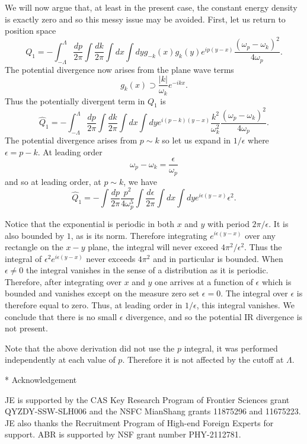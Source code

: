 \def\letter{0}\def\pr{0}\documentclass[a4paper,12pt, epsfig]{article}
\makeatletter
\renewcommand{\(}{\begin{equation}}
\renewcommand{\)}{end{equation} \vspace{-.05in}\linebreak}
\renewcommand{\=}{\hspace{-.03in}=\hspace{-.02in}}
\renewcommand{\(}{\begin{equation}}
\renewcommand{\)}{\end{equation}}
\renewcommand{\(}{\begin{equation}}
\renewcommand{\)}{\end{equation}}
\def\lpin#1{\int^\Lambda_{-\Lambda} \frac{d#1}{2\pi}}
\def\pin#1{\int \frac{d#1}{2\pi}}
\newcommand{\beq}{\begin{equation}}
\newcommand{\eeq}{\end{equation}}
\def\section{\@startsection{section}{1}{\z@}{3.5ex plus 1ex minus  .2ex}{2.3ex plus .2ex}{\large\bf}}
\makeatother
\begin{document}
We will now argue that, at least in the present case, the constant energy density is exactly zero and so this messy issue may be avoided.  First, let us return to position space
\beq
Q_1=-\lpin{p}\pin{k}\int dx\int dy {g}_{-k}(x)  {g}_k(y) e^{ip(y-x)} \frac{\left(\omega_{p}-\omega_k\right)^2}{4\omega_p}.
\eeq
The potential divergence now arises from the plane wave terms
\beq
g_k(x)\supset \frac{|k|}{\omega_k}e^{-ikx}.
\eeq
Thus the potentially divergent term in $Q_1$ is
\beq
\hat{Q}_1=-\lpin{p}\pin{k}\int dx\int dy e^{i(p-k)(y-x)} \frac{k^2}{\omega^2_k}\frac{\left(\omega_{p}-\omega_k\right)^2}{4\omega_p}.
\eeq
The potential divergence arises from $p\sim k$ so let us expand in $1/\epsilon$ where $\epsilon=p-k$.  At leading order
\beq
\omega_p-\omega_k=\frac{\epsilon}{\omega_p}
\eeq
and so at leading order, at $p\sim k$, we have
\beq
\hat{Q}_1=-\pin{p}\frac{p^2}{4\omega_p^5} \pin{\epsilon}\int dx\int dy e^{i\epsilon(y-x)} \epsilon^2.
\eeq

Notice that the exponential is periodic in both $x$ and $y$ with period $2\pi/\epsilon$.  It is also bounded by $1$, as is its norm.  Therefore integrating $e^{i\epsilon(y-x)}$ over any rectangle on the $x-y$ plane, the integral will never exceed $4\pi^2/\epsilon^2$.  Thus the integral of $\epsilon^2 e^{i\epsilon(y-x)}$ never exceeds $4\pi^2$ and in particular is bounded.  When $\epsilon\neq 0$ the integral vanishes in the sense of a distribution as it is periodic.  Therefore, after integrating over $x$ and $y$ one arrives at a function of $\epsilon$ which is bounded and vanishes except on the measure zero set $\epsilon=0$.  The integral over $\epsilon$ is therefore equal to zero.  Thus, at leading order in $1/\epsilon$, this integral vanishes.  We conclude that there is no small $\epsilon$ divergence, and so the potential IR divergence is not present.  

Note that the above derivation did not use the $p$ integral, it was performed independently at each value of $p$.  Therefore it is not affected by the cutoff at $\Lambda$.

\section* {Acknowledgement}

\noindent
JE is supported by the CAS Key Research Program of Frontier Sciences grant QYZDY-SSW-SLH006 and the NSFC MianShang grants 11875296 and 11675223.   JE also thanks the Recruitment Program of High-end Foreign Experts for support.  ABR is supported by NSF grant number PHY-2112781.
\end{document}
